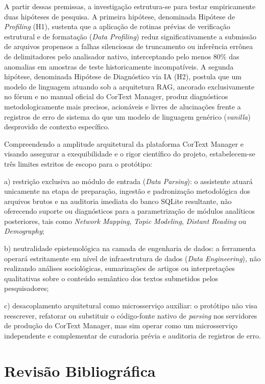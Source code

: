 \documentclass[
	oneside,
	a4paper,
	12pt,
	chapter=TITLE,
	section=TITLE,
	english,
	brazilian
]{abntex2}
\begin{document}
A partir dessas premissas, a investigação estrutura-se para testar empiricamente duas hipóteses de pesquisa. A primeira hipótese, denominada Hipótese de \textit{Profiling} (H1), sustenta que a aplicação de rotinas prévias de verificação estrutural e de formatação (\textit{Data Profiling}) reduz significativamente a submissão de arquivos propensos a falhas silenciosas de truncamento ou inferência errônea de delimitadores pelo analisador nativo, interceptando pelo menos 80\% das anomalias em amostras de teste historicamente incompatíveis. A segunda hipótese, denominada Hipótese de Diagnóstico via IA (H2), postula que um modelo de linguagem atuando sob a arquitetura RAG, ancorado exclusivamente no fórum e no manual oficial do CorText Manager, produz diagnósticos metodologicamente mais precisos, acionáveis e livres de alucinações frente a registros de erro de sistema do que um modelo de linguagem genérico (\textit{vanilla}) desprovido de contexto específico.

Compreendendo a amplitude arquitetural da plataforma CorText Manager e visando assegurar a exequibilidade e o rigor científico do projeto, estabelecem-se três limites estritos de escopo para o protótipo:

\par\indent a) restrição exclusiva ao módulo de entrada (\textit{Data Parsing}): o assistente atuará unicamente na etapa de preparação, ingestão e padronização metodológica dos arquivos brutos e na auditoria imediata do banco SQLite resultante, não oferecendo suporte ou diagnósticos para a parametrização de módulos analíticos posteriores, tais como \textit{Network Mapping}, \textit{Topic Modeling}, \textit{Distant Reading} ou \textit{Demography};
\par\indent b) neutralidade epistemológica na camada de engenharia de dados: a ferramenta operará estritamente em nível de infraestrutura de dados (\textit{Data Engineering}), não realizando análises sociológicas, sumarizações de artigos ou interpretações qualitativas sobre o conteúdo semântico dos textos submetidos pelos pesquisadores;
\par\indent c) desacoplamento arquitetural como microsserviço auxiliar: o protótipo não visa reescrever, refatorar ou substituir o código-fonte nativo de \textit{parsing} nos servidores de produção do CorText Manager, mas sim operar como um microsserviço independente e complementar de curadoria prévia e auditoria de registros de erro.

\chapter{Revisão Bibliográfica}\label{sec:revisao_bibliografica}
\end{document}
